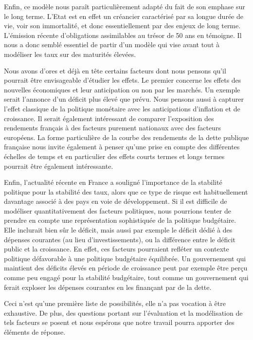 \documentclass[a4paper]{article}
\begin{document}
Enfin, ce modèle nous paraît particulièrement adapté du fait de son emphase sur le long terme. L’Etat est en effet un créancier caractérisé par sa longue durée de vie, voir son immortalité, et donc essentiellement par des enjeux de long terme. L’émission récente d’obligations assimilables au trésor de 50 ans en témoigne. Il nous a donc semblé essentiel de partir d’un modèle qui vise avant tout à modéliser les taux sur des maturités élevées.

Nous avons d’ores et déjà en tête certains facteurs dont nous pensons qu’il pourrait être envisageable d’étudier les effets. Le premier concerne les effets des nouvelles économiques et leur anticipation ou non par les marchés. Un exemple serait l’annonce d’un déficit plus élevé que prévu. Nous pensons aussi à capturer l’effet classique de la politique monétaire avec les anticipations d’inflation et de croissance. Il serait également intéressant de comparer l’exposition des rendements français à des facteurs purement nationaux avec des facteurs européens.
La forme particulière de la courbe des rendements de la dette publique française nous invite également à penser qu’une prise en compte des différentes échelles de temps et en particulier des effets courts termes et longs termes pourrait être également intéressante.

Enfin, l’actualité récente en France a souligné l’importance de la stabilité politique pour la stabilité des taux, alors que ce type de risque est habituellement davantage associé à des pays en voie de développement. Si il est difficile de modéliser quantitativement des facteurs politiques, nous pourrions tenter de prendre en compte une représentation sophistiquée de la politique budgétaire. Elle inclurait bien sûr le déficit, mais aussi par exemple le déficit dédié à des dépenses courantes (au lieu d’investissements), ou la différence entre le déficit public et la croissance. En effet, ces facteurs pourraient refléter un contexte politique défavorable à une politique budgétaire équilibrée. Un gouvernement qui maintient des déficits élevés en période de croissance peut par exemple être perçu comme peu engagé pour la stabilité budgétaire, tout comme un gouvernement qui ferait exploser les dépenses courantes en les finançant par de la dette.

Ceci n’est qu’une première liste de possibilités, elle n’a pas vocation à être exhaustive. De plus, des questions portant sur l’évaluation et la modélisation de tels facteurs se posent et nous espérons que notre travail pourra apporter des éléments de réponse.
\newpage
\end{document}

